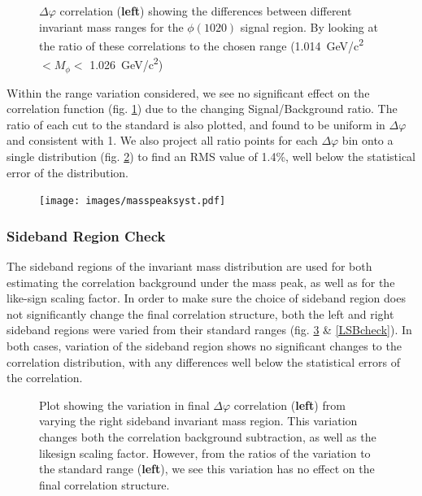 \documentclass[ALICE,manyauthors]{ALICE_analysis_notes}
\begin{document}
\begin{itemize}
\begin{figure}[ht]
\centering
\begin{subfigure}{
\texttt{[image: images/masspeakdphi.pdf]}}
\end{subfigure}
\begin{subfigure}{
\texttt{[image: images/masspeakratios.pdf]}}
\end{subfigure}
\caption{$\Delta\varphi$ correlation (\textbf{left}) showing the differences between different invariant mass ranges for the $\phi(1020)$ signal region.  By looking at the ratio of these correlations to the chosen range (\SI{1.014}{GeV/c^2}$ < M_{\phi} <$ \SI{1.026}{GeV/c^2})}
\label{masspeakcheck}
\end{figure}

Within the range variation considered, we see no significant effect on the correlation function (fig. \ref{masspeakcheck}) due to the changing Signal/Background ratio. The ratio of each cut to the standard is also plotted, and found to be uniform in $\Delta\varphi$ and consistent with 1.  We also project all ratio points for each $\Delta\varphi$ bin onto a single distribution (fig. \ref{masspeakRMS}) to find an RMS value of 1.4\%, well below the statistical error of the distribution.

\begin{figure}[ht]
\centering
\texttt{[image: images/masspeaksyst.pdf]}
\caption{ }
\label{masspeakRMS}
\end{figure}


\subsubsection{Sideband Region Check}

The sideband regions of the invariant mass distribution are used for both estimating the correlation background under the mass peak, as well as for the like-sign scaling factor.  In order to make sure the choice of sideband region does not significantly change the final correlation structure, both the left and right sideband regions were varied from their standard ranges (fig. \ref{RSBcheck} \& \ref{LSBcheck}).  In both cases, variation of the sideband region shows no significant changes to the correlation distribution, with any differences well below the statistical errors of the correlation.

\begin{figure}[ht]
\centering
\begin{subfigure}{
\texttt{[image: images/RSBrangedphi.pdf]}}
\end{subfigure}
\begin{subfigure}{
\texttt{[image: images/RSBrangeratios.pdf]}}
\end{subfigure}
\caption{Plot showing the variation in final $\Delta\varphi$ correlation (\textbf{left}) from varying the right sideband invariant mass region.  This variation changes both the correlation background subtraction, as well as the likesign scaling factor. However, from the ratios of the variation to the standard range (\textbf{left}), we see this variation has no effect on the final correlation structure.}
\label{RSBcheck}
\end{figure}


\end{itemize}
\end{document}
